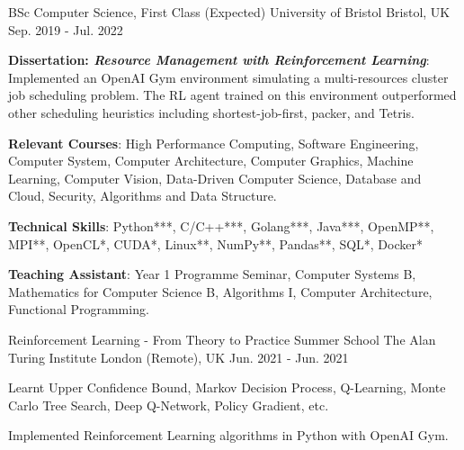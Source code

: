 

\begin{cventries}

  \cventry
    {BSc Computer Science, First Class (Expected)} %
    {University of Bristol} %
    {Bristol, UK} %
    {Sep. 2019 - Jul. 2022} %
    {
      \begin{cvitems} %
      \item {\textbf{Dissertation: \textit{Resource Management with Reinforcement Learning}}: Implemented an OpenAI Gym environment simulating a multi-resources cluster job scheduling problem. The RL agent trained on this environment outperformed other scheduling heuristics including shortest-job-first, packer, and Tetris.}
        \item {\textbf{Relevant Courses}: High Performance Computing, Software Engineering, Computer System, Computer Architecture, Computer Graphics, Machine Learning, Computer Vision, Data-Driven Computer Science, Database and Cloud, Security, Algorithms and Data Structure.}
        \item {\textbf{Technical Skills}: Python***, C/C++***, Golang***, Java***, OpenMP**, MPI**, OpenCL*, CUDA*, Linux**, NumPy**, Pandas**, SQL*, Docker*}
        \item {\textbf{Teaching Assistant}: Year 1 Programme Seminar, Computer Systems B, Mathematics for Computer Science B, Algorithms I, Computer Architecture, Functional Programming.}
      \end{cvitems}
    }
    
  \cventry
    {Reinforcement Learning - From Theory to Practice Summer School} %
    {The Alan Turing Institute} %
    {London (Remote), UK} %
    {Jun. 2021 - Jun. 2021} %
    {
      \begin{cvitems} %
        \item {Learnt Upper Confidence Bound, Markov Decision Process, Q-Learning, Monte Carlo Tree Search, Deep Q-Network, Policy Gradient, etc.}
        \item {Implemented Reinforcement Learning algorithms in Python with OpenAI Gym.}
      \end{cvitems}
    }

\end{cventries}
